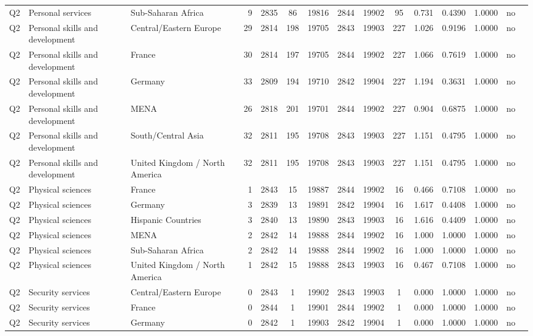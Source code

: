 \begin{longtable}{lllrcccccccccll}
Q2 & Personal services & Sub-Saharan Africa & 9 & 2835 & 86 & 19816 & 2844 & 19902 & 95 & 0.731 & 0.4390 & 1.0000 & no \\
Q2 & Personal skills and development & Central/Eastern Europe & 29 & 2814 & 198 & 19705 & 2843 & 19903 & 227 & 1.026 & 0.9196 & 1.0000 & no \\
Q2 & Personal skills and development & France & 30 & 2814 & 197 & 19705 & 2844 & 19902 & 227 & 1.066 & 0.7619 & 1.0000 & no \\
Q2 & Personal skills and development & Germany & 33 & 2809 & 194 & 19710 & 2842 & 19904 & 227 & 1.194 & 0.3631 & 1.0000 & no \\
Q2 & Personal skills and development & MENA & 26 & 2818 & 201 & 19701 & 2844 & 19902 & 227 & 0.904 & 0.6875 & 1.0000 & no \\
Q2 & Personal skills and development & South/Central Asia & 32 & 2811 & 195 & 19708 & 2843 & 19903 & 227 & 1.151 & 0.4795 & 1.0000 & no \\
Q2 & Personal skills and development & United Kingdom / North America & 32 & 2811 & 195 & 19708 & 2843 & 19903 & 227 & 1.151 & 0.4795 & 1.0000 & no \\
Q2 & Physical sciences & France & 1 & 2843 & 15 & 19887 & 2844 & 19902 & 16 & 0.466 & 0.7108 & 1.0000 & no \\
Q2 & Physical sciences & Germany & 3 & 2839 & 13 & 19891 & 2842 & 19904 & 16 & 1.617 & 0.4408 & 1.0000 & no \\
Q2 & Physical sciences & Hispanic Countries & 3 & 2840 & 13 & 19890 & 2843 & 19903 & 16 & 1.616 & 0.4409 & 1.0000 & no \\
Q2 & Physical sciences & MENA & 2 & 2842 & 14 & 19888 & 2844 & 19902 & 16 & 1.000 & 1.0000 & 1.0000 & no \\
Q2 & Physical sciences & Sub-Saharan Africa & 2 & 2842 & 14 & 19888 & 2844 & 19902 & 16 & 1.000 & 1.0000 & 1.0000 & no \\
Q2 & Physical sciences & United Kingdom / North America & 1 & 2842 & 15 & 19888 & 2843 & 19903 & 16 & 0.467 & 0.7108 & 1.0000 & no \\
Q2 & Security services & Central/Eastern Europe & 0 & 2843 & 1 & 19902 & 2843 & 19903 & 1 & 0.000 & 1.0000 & 1.0000 & no \\
Q2 & Security services & France & 0 & 2844 & 1 & 19901 & 2844 & 19902 & 1 & 0.000 & 1.0000 & 1.0000 & no \\
Q2 & Security services & Germany & 0 & 2842 & 1 & 19903 & 2842 & 19904 & 1 & 0.000 & 1.0000 & 1.0000 & no \\

\end{longtable}
